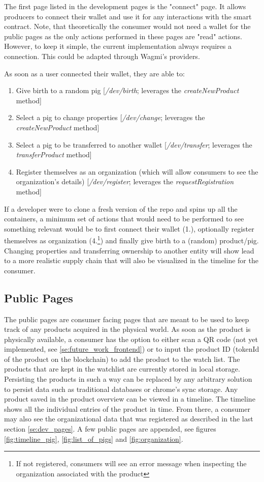 \documentclass[oneside,a4paper,12pt, colorinlistoftodos]{article} %
\begin{document}
The first page listed in the development pages is the "connect" page. It allows producers to connect their wallet and use it for any interactions with the smart contract. Note, that theoretically the consumer would not need a wallet for the public pages as the only actions performed in these pages are "read" actions. However, to keep it simple, the current implementation always requires a connection. This could be adapted through Wagmi's providers.

As soon as a user connected their wallet, they are able to:
\begin{enumerate}
    \item Give birth to a random pig [\textit{/dev/birth}; leverages the \textit{createNewProduct} method]
    \item Select a pig to change properties [\textit{/dev/change}; leverages the \textit{createNewProduct} method]
    \item Select a pig to be transferred to another wallet [\textit{/dev/transfer}; leverages the \textit{transferProduct} method]
    \item Register themselves as an organization (which will allow consumers to see the organization's details) [\textit{/dev/register}; leverages the \textit{requestRegistration} method]
\end{enumerate}

If a developer were to clone a fresh version of the repo and spins up all the containers, a minimum set of actions that would need to be performed to see something relevant would be to first connect their wallet (1.), optionally register themselves as organization (4.\footnote{If not registered, consumers will see an error message when inspecting the organization associated with the product}) and finally give birth to a (random) product/pig. Changing properties and transferring ownership to another entity will show lead to a more realistic supply chain that will also be visualized in the timeline for the consumer. 

\subsection{Public Pages}\label{se:public_pages}
The public pages are consumer facing pages that are meant to be used to keep track of any products acquired in the physical world. As soon as the product is physically available, a consumer has the option to either scan a QR code (not yet implemented, see \ref{se:future_work_frontend}) or to input the product ID (tokenId of the product on the blockchain) to add the product to the watch list. The products that are kept in the watchlist are currently stored in local storage. Persisting the products in such a way can be replaced by any arbitrary solution to persist data such as traditional databases or chrome's sync storage.
Any product saved in the product overview can be viewed in a timeline. The timeline shows all the individual entries of the product in time. From there, a consumer may also see the organizational data that was registered as described in the last section \ref{se:dev_pages}. A few public pages are appended, see figures \ref{fig:timeline_pig}, \ref{fig:list_of_pigs} and \ref{fig:organization}.
\end{document}
